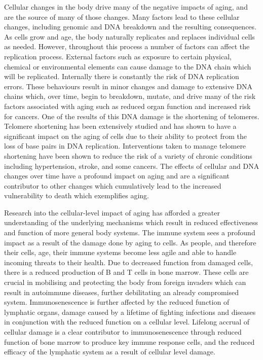 \documentclass{article}
\begin{document}
Cellular changes in the body drive many of the negative impacts of aging, and are the source of many of those changes. Many factors lead to these cellular changes, including genomic and DNA breakdown and the resulting consequences. As cells grow and age, the body naturally replicates and replaces individual cells as needed. However, throughout this process a number of factors can affect the replication process. External factors such as exposure to certain physical, chemical or environmental elements can cause damage to the DNA chain which will be replicated. Internally there is constantly the risk of DNA replication errors. These behaviours result in minor changes and damage to extensive DNA chains which, over time, begin to breakdown, mutate, and drive many of the risk factors associated with aging such as reduced organ function and increased risk for cancers. One of the results of this DNA damage is the shortening of telomeres. Telomere shortening has been extensively studied and has shown to have a significant impact on the aging of cells due to their ability to protect from the loss of base pairs in DNA replication. Interventions taken to manage telomere shortening have been shown to reduce the risk of a variety of chronic conditions including hypertension, stroke, and some cancers. The effects of cellular and DNA changes over time have a profound impact on aging and are a significant contributor to other changes which cumulatively lead to the increased vulnerability to death which exemplifies aging.


Research into the cellular-level impact of aging has afforded a greater understanding of the underlying mechanisms which result in reduced effectiveness and function of more general body systems. The immune system sees a profound impact as a result of the damage done by aging to cells. As people, and therefore their cells, age, their immune systems become less agile and able to handle incoming threats to their health. Due to decreased function from damaged cells, there is a reduced production of B and T cells in bone marrow. These cells are crucial in mobilising and protecting the body from foreign invaders which can result in autoimmune diseases, further debilitating an already compromised system. Immunosenescence is further affected by the reduced function of lymphatic organs, damage caused by a lifetime of fighting infections and diseases in conjunction with the reduced function on a cellular level. Lifelong accrual of cellular damage is a clear contributor to immunosenescence through reduced function of bone marrow to produce key immune response cells, and the reduced efficacy of the lymphatic system as a result of cellular level damage.
\end{document}
